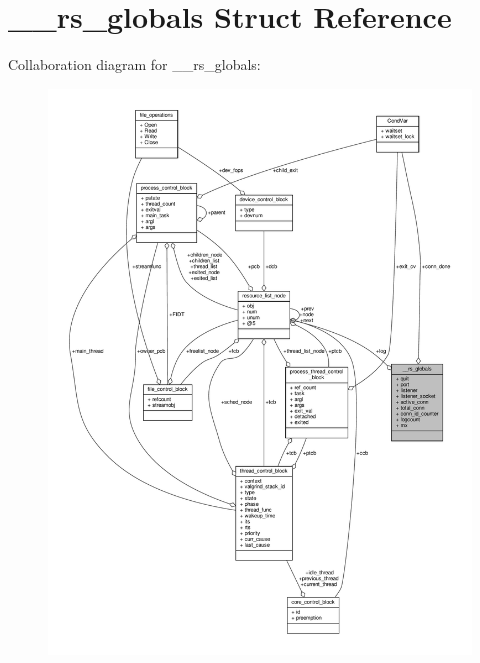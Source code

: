 \hypertarget{struct____rs__globals}{}\section{\+\_\+\+\_\+rs\+\_\+globals Struct Reference}
\label{struct____rs__globals}


Collaboration diagram for \+\_\+\+\_\+rs\+\_\+globals\+:\nopagebreak
\begin{figure}[H]
\begin{center}
\leavevmode
\includegraphics[width=350pt]{struct____rs__globals__coll__graph}
\end{center}
\end{figure}
